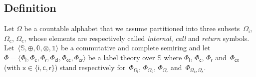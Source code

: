 \documentclass[runningheads]{llncs}
\def\<#1>{\langle #1 \rangle}
\newcommand{\Semiring}{\mathbb{S}}
\newcommand{\zero}{\mathbb{0}}
\newcommand{\one}{\mathbb{1}}
\newcommand{\call}[1]{\ensuremath #1} %
\newcommand{\return}[1]{\ensuremath #1} %
\def\Omegai{{\Omega_\mathsf{i}}}
\def\Omegac{{\Omega_\mathsf{c}}}
\def\Omegar{{\Omega_\mathsf{r}}}
\def\Phii{{\Phi_\mathsf{i}}}
\def\Phic{{\Phi_\mathsf{c}}}
\def\Phir{{\Phi_\mathsf{r}}}
\def\Phici{{\Phi_\mathsf{ci}}}
\def\Phicc{{\Phi_\mathsf{cc}}}
\def\Phicr{{\Phi_\mathsf{cr}}}
\def\Phicx{{\Phi_\mathsf{cx}}}
\begin{document}
\subsection{Definition}
Let $\Omega$ be a countable alphabet 
that we assume partitioned into three 
subsets~$\Omegai$, $\Omegac$, $\Omegac$,
whose elements are respectively called 
\emph{internal}, \emph{call} and \emph{return} symbols.
Let~$\< \Semiring, \oplus, \zero, \otimes, \one>$ be a commutative and complete semiring and let  
$\bar\Phi = \< \Phii, \Phic, \Phir, \Phici, \Phicc, \Phicr>$ 
be a label theory over $\Semiring$
where $\Phii$, $\Phic$, $\Phir$ and~$\Phicx$ (with $\mathsf{x} \in \{ \mathsf{i}, \mathsf{c}, \mathsf{r}\}$) 
stand respectively 
for~$\Phi_\Omegai$, $\Phi_\Omegac$, $\Phi_\Omegar$ and~$\Phi_{\Omegac, \Omega_\mathsf{x}}$.
%
\end{document}
